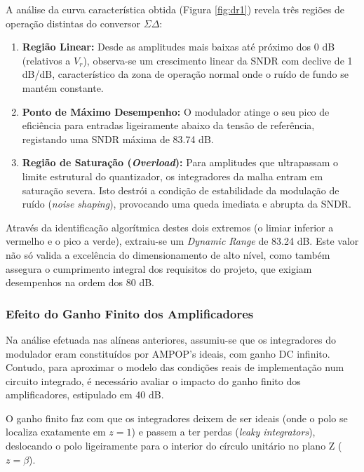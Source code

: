 A análise da curva característica obtida (Figura \ref{fig:dr1}) revela três regiões de operação distintas do conversor $\Sigma\Delta$:
\begin{enumerate}
    \item \textbf{Região Linear:} Desde as amplitudes mais baixas até próximo dos 0 dB (relativos a $V_r$), observa-se um crescimento linear da SNDR com declive de 1 dB/dB, característico da zona de operação normal onde o ruído de fundo se mantém constante.
    \vspace{0.2cm}
    \item \textbf{Ponto de Máximo Desempenho:} O modulador atinge o seu pico de eficiência para entradas ligeiramente abaixo da tensão de referência, registando uma SNDR máxima de 83.74 dB.
    \vspace{0.2cm}
    \item \textbf{Região de Saturação (\textit{Overload}):} Para amplitudes que ultrapassam o limite estrutural do quantizador, os integradores da malha entram em saturação severa. Isto destrói a condição de estabilidade da modulação de ruído (\textit{noise shaping}), provocando uma queda imediata e abrupta da SNDR.
\end{enumerate}

Através da identificação algorítmica destes dois extremos (o limiar inferior a vermelho e o pico a verde),
extraiu-se um \textit{Dynamic Range} de 83.24 dB. Este valor não só valida a excelência do dimensionamento
de alto nível, como também assegura o cumprimento integral dos requisitos do projeto, que exigiam desempenhos
na ordem dos 80 dB.



\vspace{0.5cm}
\subsubsection{Efeito do Ganho Finito dos Amplificadores}

Na análise efetuada nas alíneas anteriores, assumiu-se que os integradores do modulador eram constituídos por
AMPOP's ideais, com ganho DC infinito. Contudo, para aproximar o modelo das
condições reais de implementação num circuito integrado, é necessário avaliar o impacto do ganho finito dos
amplificadores, estipulado em 40 dB.

O ganho finito faz com que os integradores deixem de ser ideais (onde o polo se localiza exatamente em $z = 1$)
e passem a ter perdas (\textit{leaky integrators}), deslocando o polo ligeiramente para o interior do círculo
unitário no plano Z ($z = \beta$). 

